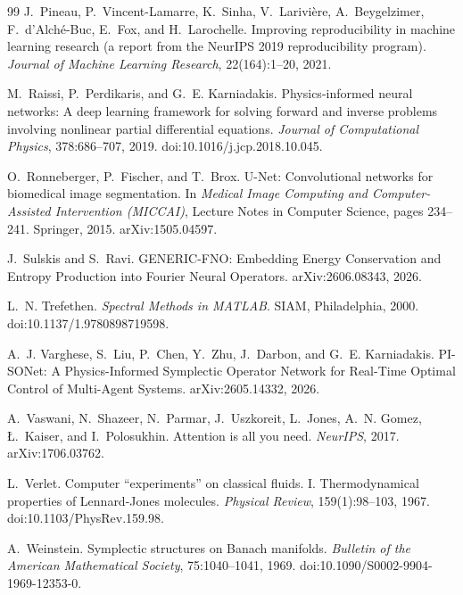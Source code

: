 \documentclass[11pt]{article}
\theoremstyle{definition}
\theoremstyle{remark}
\begin{document}
\begin{thebibliography}{99}
J.~Pineau, P.~Vincent-Lamarre, K.~Sinha, V.~Larivi\`ere, A.~Beygelzimer,
F.~d'Alch\'e-Buc, E.~Fox, and H.~Larochelle.
\newblock Improving reproducibility in machine learning research (a report from
the {NeurIPS} 2019 reproducibility program).
\newblock \emph{Journal of Machine Learning Research}, 22(164):1--20, 2021.

M.~Raissi, P.~Perdikaris, and G.~E. Karniadakis.
\newblock Physics-informed neural networks: A deep learning framework for
solving forward and inverse problems involving nonlinear partial differential
equations.
\newblock \emph{Journal of Computational Physics}, 378:686--707, 2019.
doi:10.1016/j.jcp.2018.10.045.

O.~Ronneberger, P.~Fischer, and T.~Brox.
\newblock U-Net: Convolutional networks for biomedical image segmentation.
\newblock In \emph{Medical Image Computing and Computer-Assisted Intervention
({MICCAI})}, Lecture Notes in Computer Science, pages 234--241. Springer, 2015.
arXiv:1505.04597.

J.~Sulskis and S.~Ravi.
\newblock GENERIC-FNO: Embedding Energy Conservation and Entropy Production into
Fourier Neural Operators.
\newblock arXiv:2606.08343, 2026.

L.~N. Trefethen.
\newblock \emph{Spectral Methods in MATLAB}.
\newblock SIAM, Philadelphia, 2000. doi:10.1137/1.9780898719598.

A.~J. Varghese, S.~Liu, P.~Chen, Y.~Zhu, J.~Darbon, and G.~E. Karniadakis.
\newblock PI-SONet: A Physics-Informed Symplectic Operator Network for
Real-Time Optimal Control of Multi-Agent Systems.
\newblock arXiv:2605.14332, 2026.

A.~Vaswani, N.~Shazeer, N.~Parmar, J.~Uszkoreit, L.~Jones, A.~N. Gomez,
{\L}.~Kaiser, and I.~Polosukhin.
\newblock Attention is all you need.
\newblock \emph{NeurIPS}, 2017. arXiv:1706.03762.

L.~Verlet.
\newblock Computer ``experiments'' on classical fluids. I. Thermodynamical
properties of {L}ennard-{J}ones molecules.
\newblock \emph{Physical Review}, 159(1):98--103, 1967.
doi:10.1103/PhysRev.159.98.

A.~Weinstein.
\newblock Symplectic structures on Banach manifolds.
\newblock \emph{Bulletin of the American Mathematical Society}, 75:1040--1041,
1969. doi:10.1090/S0002-9904-1969-12353-0.


\end{thebibliography}
\end{document}
